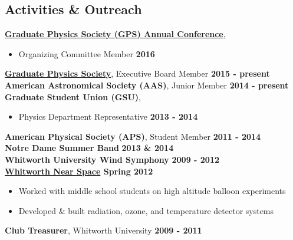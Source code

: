 \documentclass[margin]{res}
\begin{document}
\begin{resume}









\section{Activities \& Outreach}
{\bf \href{http://gradphysics.nd.edu/conference/gpsac-2016/}{Graduate Physics Society (GPS) Annual Conference}},
    \begin{itemize}\itemsep -2pt
    \item[] Organizing Committee Member \hfill {\bf 2016 }
    \end{itemize} \vspace{-10pt}
{\bf \href{gradphysics.nd.edu}{Graduate Physics Society}}, Executive Board Member \hfill {\bf 2015 - present }\\
{\bf American Astronomical Society (AAS)}, Junior Member  \hfill {\bf 2014 - present }\\
{\bf Graduate Student Union (GSU)},
    \begin{itemize}\itemsep -2pt
    \item[] Physics Department Representative  \hfill {\bf 2013 - 2014}
    \end{itemize} \vspace{-10pt}
{\bf American Physical Society (APS)}, Student Member  \hfill {\bf 2011 - 2014 }\\
{\bf Notre Dame Summer Band} \hfill {\bf 2013 \&  2014 }\\
{\bf Whitworth University Wind Symphony}  \hfill {\bf 2009 - 2012 }\\
{\bf\href{http://www.whitworthnearspace.org/wiki/Main_Page}{Whitworth Near Space} \hfill  Spring 2012}
    \begin{itemize}\itemsep -2pt
    \item[] Worked with middle school students on high altitude balloon experiments
    \item[] Developed \& built radiation, ozone, and temperature detector systems
    \end{itemize} \vspace{-10pt}
{\bf Club Treasurer}, Whitworth University \hfill {\bf2009 - 2011}


\end{resume}
\end{document}
